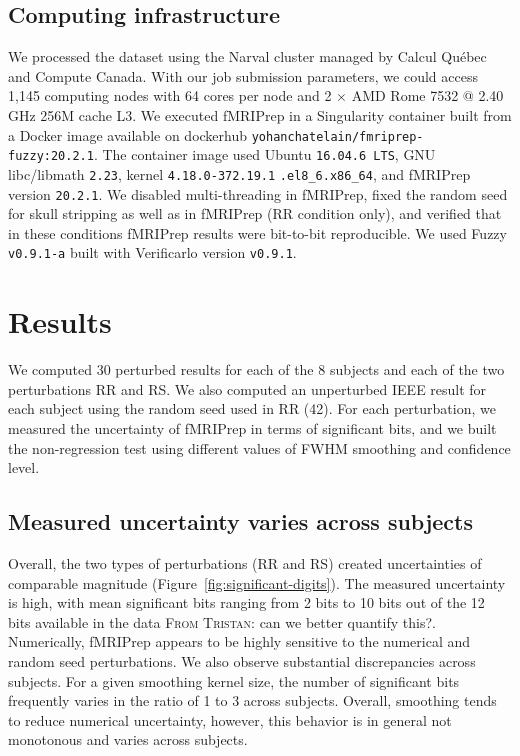 \documentclass{article}
\newcommand{\TG}[1]{\color{blue}\textsc{From Tristan:} #1\color{black}\xspace}
\newcommand{\fmriprep}{fMRIPrep\xspace}
\begin{document}
\subsection{Computing infrastructure}

We processed the dataset using the Narval cluster managed by Calcul Qu\'ebec and Compute Canada. With our job submission parameters, we could access 1,145 computing nodes with 64 cores per node and 2 $\times$ AMD Rome 7532 @ 2.40 GHz 256M cache L3. We executed \fmriprep in a Singularity container built from a Docker image available on dockerhub \texttt{yohanchatelain/fmriprep-fuzzy:20.2.1}. The container image used Ubuntu \texttt{16.04.6 LTS}, GNU libc/libmath \texttt{2.23}, kernel \texttt{4.18.0-372.19.1} \texttt{.el8\_6.x86\_64}, and fMRIPrep version \texttt{20.2.1}. We disabled multi-threading in fMRIPrep, fixed the random seed for skull stripping as well as in fMRIPrep (RR condition only), and verified that in these conditions fMRIPrep results were bit-to-bit reproducible.
We used Fuzzy \texttt{v0.9.1-a} built with Verificarlo version \texttt{v0.9.1}.

\section{Results}

We computed 30 perturbed results for each of the 8 subjects and each of the two perturbations RR and RS. We also computed an unperturbed IEEE result for each subject using the
random seed used in RR (42). For each perturbation, we measured the uncertainty of fMRIPrep in terms of significant bits, and we built the non-regression test using different values of FWHM smoothing and confidence level.

\subsection{Measured uncertainty varies across subjects}

Overall, the two types of perturbations (RR and RS) created uncertainties of comparable magnitude (Figure~\ref{fig:significant-digits}). The measured uncertainty is high, with mean significant bits ranging from 2 bits to 10 bits out of the 12 bits available in the data \TG{can we better quantify this?}. Numerically, \fmriprep appears to be highly sensitive to the numerical and random seed perturbations. We also observe substantial discrepancies across subjects. For a given smoothing kernel size, the number of significant bits frequently varies in the ratio of 1 to 3 across subjects. Overall, smoothing tends to reduce numerical uncertainty, however, this behavior is in general not monotonous and varies across subjects.
\end{document}

